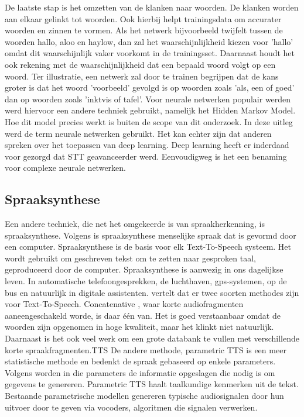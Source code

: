 De laatste stap is het omzetten van de klanken naar woorden. De klanken worden aan elkaar gelinkt tot woorden. Ook hierbij helpt trainingsdata om accurater woorden en zinnen te vormen. Als het netwerk bijvoorbeeld twijfelt tussen de woorden hallo, aloo en haylow, dan zal het waarschijnlijkheid kiezen voor 'hallo' omdat dit waarschijnlijk vaker voorkomt in de trainingsset. Daarnaast houdt het ook rekening met de waarschijnlijkheid dat een bepaald woord volgt op een woord. Ter illustratie, een netwerk zal door te trainen begrijpen dat de kans groter is dat het woord 'voorbeeld' gevolgd is op woorden zoals 'als, een of goed' dan op woorden zoals 'inktvis of tafel'. Voor neurale netwerken populair werden werd hiervoor een andere techniek gebruikt, namelijk het Hidden Markov Model. Hoe dit model precies werkt is buiten de scope van dit onderzoek.
In deze uitleg werd de term neurale netwerken gebruikt. Het kan echter zijn dat anderen spreken over het toepassen van deep learning. Deep learning heeft er inderdaad voor gezorgd dat \gls{STT} geavanceerder werd. Eenvoudigweg is het een benaming voor complexe neurale netwerken. 

\subsection{Spraaksynthese}
Een andere techniek, die net het omgekeerde is van spraakherkenning, is spraaksynthese. Volgens \autocite{Rouse2016} is spraaksynthese menselijke spraak dat is gevormd door een computer. Spraaksynthese is de basis voor elk Text-To-Speech systeem. Het wordt gebruikt om geschreven tekst om te zetten naar gesproken taal, geproduceerd door de computer.
Spraaksynthese is aanwezig in ons dagelijkse leven. In automatische telefoongesprekken, de luchthaven, gps-systemen, op de bus en natuurlijk in digitale assistenten. \autocite{Seijas2018} vertelt dat er twee soorten methodes zijn voor Text-To-Speech. Concatenative , waar korte audiofragmenten aaneengeschakeld worde, is daar één van. Het is goed verstaanbaar omdat de woorden zijn opgenomen in hoge kwaliteit, maar het klinkt niet natuurlijk. Daarnaast is het ook veel werk om een grote databank te vullen met verschillende korte spraakfragmenten.\gls{TTS}
De andere methode, parametric \gls{TTS} is een meer statistische methode en  bedenkt de spraak gebaseerd op enkele parameters. Volgens \autocite{Oord2016} worden in die parameters de informatie opgeslagen die nodig is om gegevens te genereren. Parametric \gls{TTS} haalt taalkundige kenmerken uit de tekst. Bestaande parametrische modellen genereren typische audiosignalen door hun uitvoer door te geven via vocoders, algoritmen die signalen verwerken.

